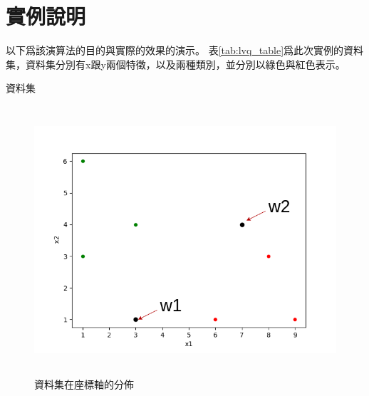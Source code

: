 \section{實例說明}

以下爲該演算法的目的與實際的效果的演示。
表\ref{tab:lvq_table}爲此次實例的資料集，資料集分別有x跟y兩個特徵，以及兩種類別，並分別以綠色與紅色表示。


\begin{table}[h!]
	\centering
	\caption{資料集}
	\label{tab:lvq_table}
	
\end{table}


\begin{figure}[h!]
	\centering
	\includegraphics[height=10cm]{./pic/2nSRVeud.png}
	\caption{資料集在座標軸的分佈}
	\label{fig:DatasetInAxis}
\end{figure}

